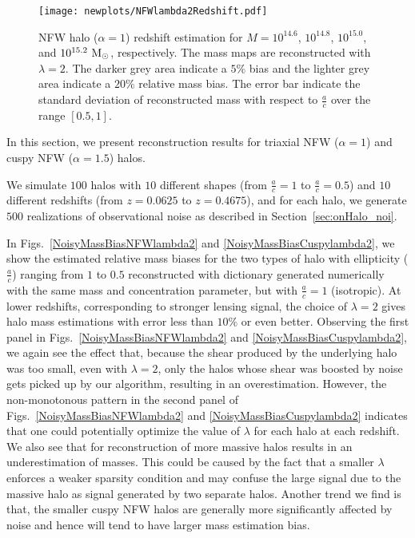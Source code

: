 \documentclass[twocolumn, usenames, dvipsnames]{aastex63}
\begin{document}
\begin{figure*}
\centering
\texttt{[image: newplots/NFWlambda2Redshift.pdf]}
\caption{
    NFW halo ($\alpha=1$) redshift estimation for $M=10^{14.6}$, $10^{14.8}$,
    $10^{15.0}$, and $10^{15.2}~\textup{M}_{\odot}$, respectively. The mass
    maps are reconstructed with $\lambda=2$. The darker grey area indicate a
    $5\%$ bias and the lighter grey area indicate a $20\%$ relative mass bias.
    The error bar indicate the standard deviation of reconstructed mass with
    respect to $\frac{a}{c}$ over the range $[0.5,1]$.
    }
    \label{NoisyRedshiftBiasNFWlambda2}
\end{figure*}

In this section, we present reconstruction results for triaxial NFW
($\alpha=1$) and cuspy NFW ($\alpha=1.5$) halos.


We simulate $100$ halos with $10$ different shapes (from $\frac{a}{c}=1$ to
$\frac{a}{c}=0.5$) and $10$ different redshifts (from $z=0.0625$ to
$z=0.4675$), and for each halo, we generate $500$ realizations of observational
noise as described in Section~\ref{sec:onHalo_noi}.

In Figs.~\ref{NoisyMassBiasNFWlambda2} and \ref{NoisyMassBiasCuspylambda2}, we
show the estimated relative mass biases for the two types of halo with ellipticity
($\frac{a}{c}$) ranging from $1$ to $0.5$ reconstructed with dictionary
generated numerically with the same mass and concentration parameter, but with
$\frac{a}{c} = 1$ (isotropic). At lower redshifts, corresponding to stronger
lensing signal, the choice of $\lambda=2$ gives halo mass estimations with
error less than $10\%$ or even better. Observing the first panel in
Figs.~\ref{NoisyMassBiasNFWlambda2} and \ref{NoisyMassBiasCuspylambda2}, we
again see the effect that, because the shear produced by the underlying halo
was too small, even with $\lambda = 2$, only the halos whose shear was boosted
by noise gets picked up by our algorithm, resulting in an overestimation.
However, the non-monotonous pattern in the second panel of
Figs.~\ref{NoisyMassBiasNFWlambda2} and \ref{NoisyMassBiasCuspylambda2}
indicates that one could potentially optimize the value of $\lambda$ for each
halo at each redshift. We also see that for reconstruction of more massive
halos results in an underestimation of masses. This could be caused by the fact
that a smaller $\lambda$ enforces a weaker sparsity condition and \splinv{} may
confuse the large signal due to the massive halo as signal generated by two
separate halos. Another trend we find is that, the smaller cuspy NFW halos are
generally more significantly affected by noise and hence will tend to have
larger mass estimation bias.
\end{document}
